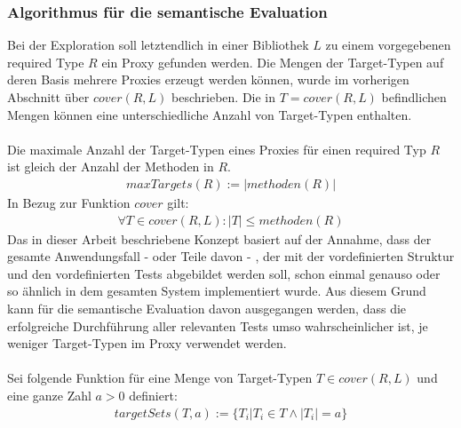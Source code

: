 \documentclass[a4paper,12pt]{article}
\begin{document}
\subsubsection{Algorithmus für die semantische Evaluation}
Bei der Exploration soll letztendlich in einer Bibliothek $L$ zu einem vorgegebenen required Type $R$ ein Proxy gefunden werden. Die Mengen der Target-Typen auf deren Basis mehrere Proxies erzeugt werden können, wurde im vorherigen Abschnitt über $\mathit{cover(R,L)}$ beschrieben. Die in $T = \mathit{cover(R,L)}$ befindlichen Mengen können eine unterschiedliche Anzahl von Target-Typen enthalten.
\\\\
Die maximale Anzahl der Target-Typen eines Proxies für einen required Typ $R$ ist gleich der Anzahl der Methoden in $R$.
\begin{gather*}
\mathit{maxTargets(R)} := |\mathit{methoden(R)}|
\end{gather*}
\noindent
In Bezug zur Funktion $\mathit{cover}$ gilt:
\begin{gather*}
\forall T \in \mathit{cover(R,L)} : |T| \leq \mathit{methoden(R)}
\end{gather*}
\noindent
Das in dieser Arbeit beschriebene Konzept basiert auf der Annahme, dass der gesamte Anwendungsfall - oder Teile davon - , der mit der vordefinierten Struktur und den vordefinierten Tests abgebildet werden soll, schon einmal genauso oder so ähnlich in dem gesamten System implementiert wurde. Aus diesem Grund kann für die semantische Evaluation davon ausgegangen werden, dass die erfolgreiche Durchführung aller relevanten Tests umso wahrscheinlicher ist, je weniger Target-Typen im Proxy verwendet werden.
\\\\
Sei folgende Funktion für eine Menge von Target-Typen $T \in \mathit{cover(R,L)}$ und eine ganze Zahl $a > 0$ definiert:
\begin{gather*}
\mathit{targetSets(T,a)} := \{T_i | T_i \in T \wedge |T_i| = a\}
\end{gather*}
\end{document}
